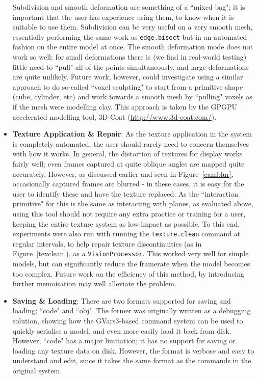 \documentclass[a4paper,10pt]{report}
\begin{document}
\begin{itemize}
{Subdivision and smooth deformation are something of a ``mixed bag"; it is important that the user has experience using them, to know when it is suitable to use them. Subdivision can be very useful on a very smooth mesh, essentially performing the same work as \texttt{edge.bisect} but in an automated fashion on the entire model at once. The smooth deformation mode does not work so well; for small deformations there is (we find in real-world testing) little need to ``pull" all of the points simultaneously, and large deformations are quite unlikely. Future work, however, could investigate using a similar approach to do so-called ``voxel sculpting" to start from a primitive shape (cube, cylinder, etc) and work towards a smooth mesh by ``pulling" voxels as if the mesh were modelling clay. This approach is taken by the GPGPU accelerated modelling tool, 3D-Coat (\url{http://www.3d-coat.com/}).
}

\item{\textbf{Texture Application \& Repair}: As the texture application in the system is completely automated, the user should rarely need to concern themselves with how it works. In general, the distortion of textures for display works fairly well; even frames captured at quite oblique angles are mapped quite accurately. However, as discussed earlier and seen in Figure~\ref{camblur}, occasionally captured frames are blurred - in these cases, it is easy for the user to identify these and have the texture replaced. As the ``interaction primitive" for this is the same as interacting with planes, as evaluated above, using this tool should not require any extra practice or training for a user, keeping the entire texture system as low-impact as possible. To this end, experiments were also run with running the \texttt{texture.clean} command at regular intervals, to help repair texture discontinuities (as in Figure~\ref{texclean}), as a \texttt{VisionProcessor}. This worked very well for simple models, but can significantly reduce the framerate when the model becomes too complex. Future work on the efficiency of this method, by introducing further memoisation may well alleviate the problem.
}

\item{\textbf{Saving \& Loading}: There are two formats supported for saving and loading; ``code" and ``obj". The former was originally written as a debugging solution, showing how the GVars3-based command system can be used to quickly serialise a model, and even more easily load it back from disk. However, ``code" has a major limitation; it has no support for saving or loading any texture data on disk. However, the format is verbose and easy to understand and edit, since it takes the same format as the commands in the original system.

}
\end{itemize}
\end{document}
